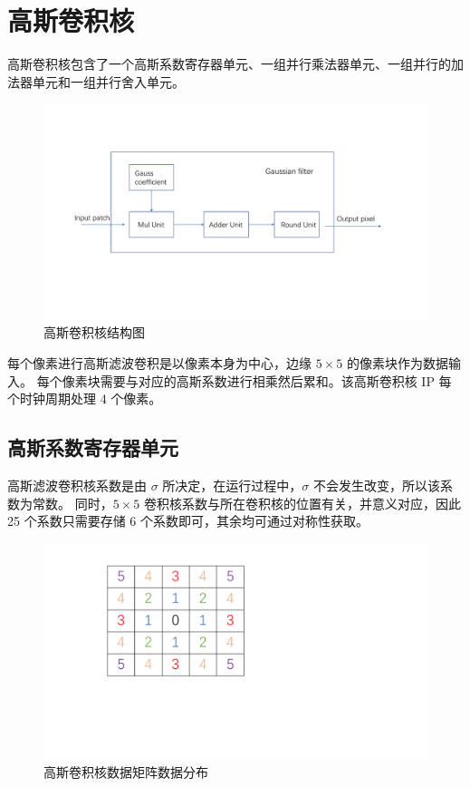 \documentclass[12pt, a4paper, oneside]{ctexbook}
\begin{document}
	\section{高斯卷积核}
	高斯卷积核包含了一个高斯系数寄存器单元、一组并行乘法器单元、一组并行的加法器单元和一组并行舍入单元。
		\begin{figure}[h]
			\centering
			\includegraphics[scale=0.55]{pic/gaussian_filter}
			\caption{高斯卷积核结构图}
			\label{fig:gaussianfilter}
		\end{figure}
	每个像素进行高斯滤波卷积是以像素本身为中心，边缘 $5\times5$ 的像素块作为数据输入。
	每个像素块需要与对应的高斯系数进行相乘然后累和。该高斯卷积核 IP 每个时钟周期处理 4 个像素。
	\subsection{高斯系数寄存器单元}
	高斯滤波卷积核系数是由 $\sigma$ 所决定，在运行过程中，$\sigma$ 不会发生改变，所以该系数为常数。
	同时，$5\times5$ 卷积核系数与所在卷积核的位置有关，并意义对应，因此25 个系数只需要存储 6 个系数即可，其余均可通过对称性获取。
	\begin{figure}[h]
		\centering
		\includegraphics[scale=0.4]{pic/number}
		\caption{高斯卷积核数据矩阵数据分布}
		\label{fig:number}
	\end{figure}
\end{document}
